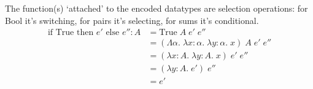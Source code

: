\documentclass[11pt]{article}
\begin{document}
{{        The function(s) `attached' to the encoded datatypes are selection operations: for Bool it's switching, for pairs
        it's selecting, for sums it's conditional.
        \begin{align*}
        \text{if True then }e'\text{ else } e'' : A &= \text{True}\;A\;e'\;e'' \\
                                    &= (\Lambda\alpha.\;\lambda x:\alpha.\;\lambda y:\alpha.\;x)\;A\;e'\;e'' \\
                                    &= (\lambda x:A.\;\lambda y:A.\;x)\;e'\;e'' \\
                                    &= (\lambda y:A.\;e')\;e'' \\
                                    &= e' \\
        \end{align*}
    }
}
\end{document}
